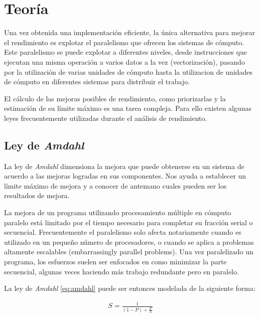 \documentclass[a4paper]{report}
\begin{document}
\section{Teor\'ia}

Una vez obtenida una implementaci\'on eficiente, la \'unica alternativa para mejorar el rendimiento es explotar el paralelismo que
ofrecen los sistemas de c\'omputo. Este paralelismo se puede explotar a diferentes niveles, desde instrucciones que ejecutan una misma operaci\'on a varios
datos a la vez (vectorizaci\'on), pasando por la utilizaci\'on de varias unidades de c\'omputo hasta la utilizacion de unidades de c\'omputo en diferentes sistemas para distribuir el trabajo.

\bigskip

El c\'alculo de las mejoras posibles de rendimiento, como priorizarlas y la estimaci\'on de su l\'imite m\'aximo es una tarea compleja.
Para ello existen algunas leyes frecuentemente utilizadas durante el an\'alisis de rendimiento.

\subsection{Ley de {\it Amdahl}}

 La ley de {\it Amdahl} \cite{amdahl} dimensiona la mejora que puede obtenerse en un sistema de acuerdo a las mejoras logradas en sus
componentes. Nos ayuda a establecer un l\'imite m\'aximo de mejora y a conocer de antemano cuales pueden ser los resultados de mejora.

\bigskip

La mejora de un programa utilizando procesamiento m\'ultiple en c\'omputo paralelo
est\'a limitado por el tiempo necesario para completar su fracci\'on serial o
secuencial. Frecuentemente el paralelismo solo afecta notariamente cuando es
utilizado en un peque\~no n\'umero de procesadores, o cuando se aplica a problemas
altamente escalables (embarrassingly parallel problems). Una vez paralelizado un
programa, los esfuerzos suelen ser enfocados en como minimizar
la parte secuencial, algunas veces haciendo m\'as trabajo redundante pero en paralelo.

\bigskip

La ley de {\it Amdahl} \ref{eq:amdahl} puede ser entonces modelada de la siguiente forma:

\begin{eqnarray}
\label{eq:amdahl}
S = \frac{1}{(1-P) + \frac{P}{N}}
\end{eqnarray}
\end{document}
